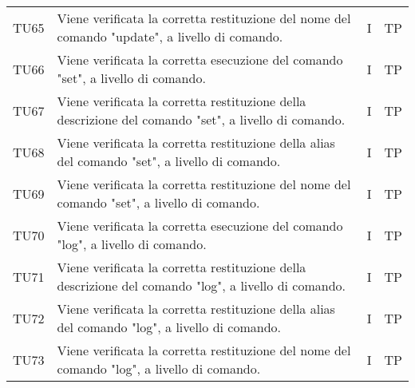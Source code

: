 \begin{longtable}{|C{1.5cm}|C{8cm}|C{3cm}|C{1cm}|}
	TU65 &
	Viene verificata la corretta restituzione del nome del comando "update", a livello di comando.  &
	I & TP\\
	
	TU66 &
	Viene verificata la corretta esecuzione del comando "set", a livello di comando.  &
	I & TP\\
	
	TU67 &
	Viene verificata la corretta restituzione della descrizione del comando "set", a livello di comando.  &
	I & TP\\
	
	TU68 &
	Viene verificata la corretta restituzione della alias del comando "set", a livello di comando.  &
	I & TP\\
	
	TU69 &
	Viene verificata la corretta restituzione del nome del comando "set", a livello di comando.  &
	I & TP\\
	
	TU70 &
	Viene verificata la corretta esecuzione del comando "log", a livello di comando.  &
	I & TP\\
	
	TU71 &
	Viene verificata la corretta restituzione della descrizione del comando "log", a livello di comando.  &
	I & TP\\
	
	TU72 &
	Viene verificata la corretta restituzione della alias del comando "log", a livello di comando.  &
	I & TP\\
	
	TU73 &
	Viene verificata la corretta restituzione del nome del comando "log", a livello di comando.  &
	I & TP\\
\end{longtable}

